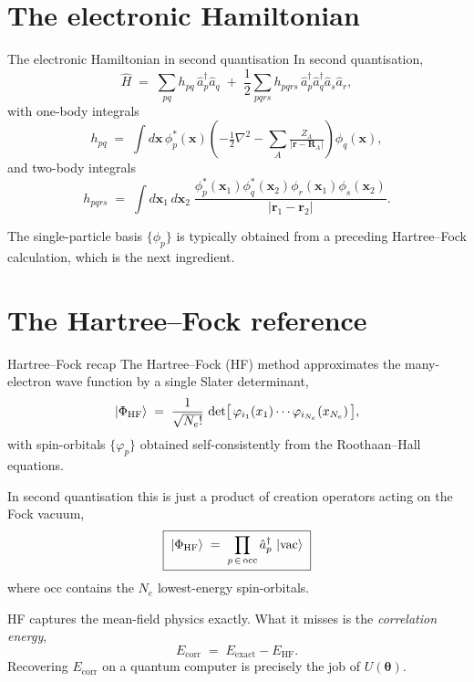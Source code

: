 \documentclass[10pt,aspectratio=169]{beamer}
\begin{document}
\section{The electronic Hamiltonian}

\begin{frame}{The electronic Hamiltonian in second quantisation}
In second quantisation,
\[
\hat H \;=\; \sum_{pq} h_{pq}\, \hat a_p^\dagger \hat a_q
\;+\;\frac12\sum_{pqrs} h_{pqrs}\, \hat a_p^\dagger \hat a_q^\dagger \hat a_s \hat a_r,
\]
with one-body integrals
\[
h_{pq} \;=\; \int d\mathbf{x}\,
\phi_p^*(\mathbf{x})\!\left(-\tfrac12\nabla^2 - \sum_A \tfrac{Z_A}{|\mathbf{r}-\mathbf{R}_A|}\right)\!\phi_q(\mathbf{x}),
\]
and two-body integrals
\[
h_{pqrs} \;=\;
\int d\mathbf{x}_1\,d\mathbf{x}_2\;
\frac{\phi_p^*(\mathbf{x}_1)\phi_q^*(\mathbf{x}_2)\phi_r(\mathbf{x}_1)\phi_s(\mathbf{x}_2)}{|\mathbf{r}_1-\mathbf{r}_2|}.
\]

\smallskip
The single-particle basis $\{\phi_p\}$ is typically obtained from a preceding Hartree--Fock calculation,
which is the next ingredient.
\end{frame}

\section{The Hartree--Fock reference}

\begin{frame}{Hartree--Fock recap}
The Hartree--Fock (HF) method approximates the many-electron wave function by a single Slater determinant,
\[
\ket{\Phi_{\mathrm{HF}}} \;=\; \frac{1}{\sqrt{N_e!}}\,
\det\!\big[\,\varphi_{i_1}(x_1)\cdots\varphi_{i_{N_e}}(x_{N_e})\,\big],
\]
with spin-orbitals $\{\varphi_p\}$ obtained self-consistently from the Roothaan--Hall equations.

\medskip
In second quantisation this is just a product of creation operators acting on the Fock vacuum,
\[
\boxed{\;
\ket{\Phi_{\mathrm{HF}}} \;=\; \prod_{p\,\in\,\mathrm{occ}} \hat a_p^\dagger \,\ket{\mathrm{vac}}\;}
\]
where $\mathrm{occ}$ contains the $N_e$ lowest-energy spin-orbitals.

\medskip
HF captures the mean-field physics exactly. What it misses is the \emph{correlation energy},
\[
E_{\mathrm{corr}} \;=\; E_{\mathrm{exact}} - E_{\mathrm{HF}}.
\]
Recovering $E_{\mathrm{corr}}$ on a quantum computer is precisely the job of $U(\bm\theta)$.
\end{frame}
\end{document}
